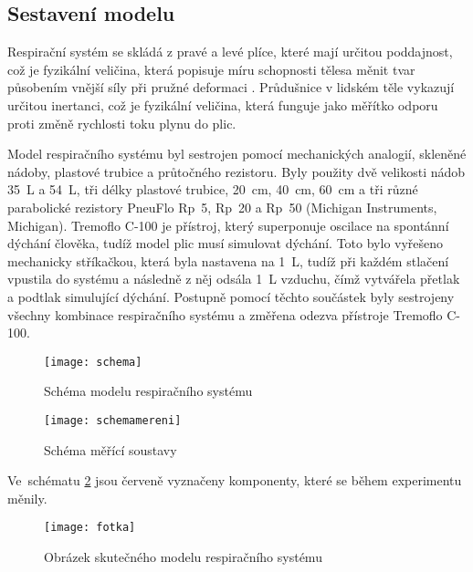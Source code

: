\subsection{Sestavení modelu}
Respirační systém se skládá z pravé a levé plíce, které mají určitou poddajnost, což je fyzikální veličina, která popisuje míru schopnosti tělesa měnit tvar působením vnější síly při pružné deformaci \cite{Poddajnost}. Průdušnice v lidském těle vykazují určitou inertanci, což je fyzikální veličina, která funguje jako měřítko odporu proti změně rychlosti toku plynu do plic\cite{Inertance}. 

 Model respiračního systému  byl sestrojen pomocí mechanických analogií, skleněné nádoby, plastové trubice a průtočného rezistoru. Byly použity dvě velikosti nádob \SI{35}{L} a \SI{54}{L}, tři délky plastové trubice, \SI{20}{cm},  \SI{40}{cm},  \SI{60}{cm}  a tři různé parabolické rezistory PneuFlo Rp~5, Rp~20 a Rp~50 (Michigan Instruments, Michigan). 
Tremoflo C-100 je přístroj, který superponuje oscilace na spontánní dýchání člověka, tudíž model plic musí simulovat dýchání. Toto bylo vyřešeno mechanicky stříkačkou, která byla nastavena na  \SI{1}{L}, tudíž při každém stlačení vpustila  do systému a následně z něj odsála \SI{1}{L} vzduchu, čímž vytvářela přetlak a podtlak simulující dýchání.  
Postupně pomocí těchto součástek byly sestrojeny všechny kombinace respiračního systému a změřena odezva přístroje Tremoflo C-100.

\begin{figure}[p]
			\centering
 			\texttt{[image: schema]}
			\caption{Schéma modelu respiračního systému}
			 \label{obrazekschema}
 \end{figure}

\begin{figure}[p]
			\centering
 			\texttt{[image: schemamereni]}
			\caption{Schéma měřící soustavy}
			 \label{obrazekschemamereni}
 \end{figure}

Ve~schématu \ref{obrazekschemamereni} jsou červeně vyznačeny komponenty, které se během experimentu měnily.

\begin{figure}[p]
			\centering
 			\texttt{[image: fotka]}
			\caption{Obrázek skutečného modelu respiračního systému}
			 \label{obrazekreal}
 \end{figure}

\clearpage

